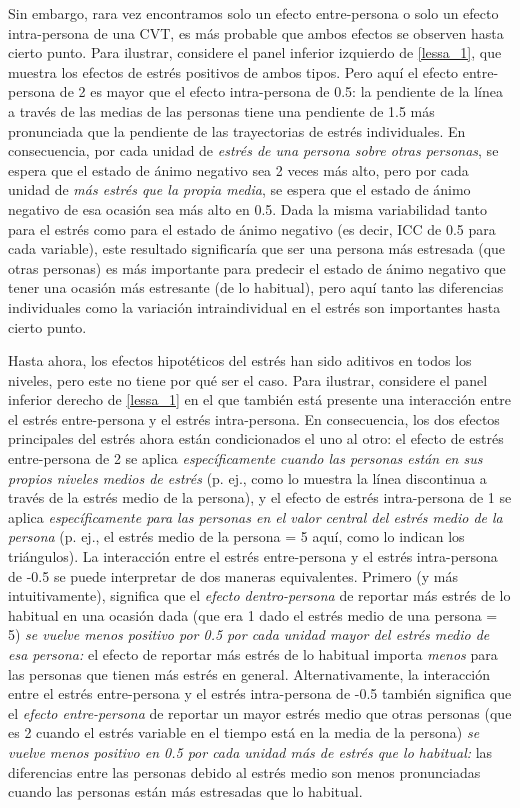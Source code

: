 \documentclass[spanish]{article}
\numberwithin{figure}{subsection}
\numberwithin{equation}{subsection}
\numberwithin{table}{subsection}
\begin{document}
Sin embargo, rara vez encontramos solo un efecto entre-persona o solo un efecto intra-persona de una CVT, es más probable
que ambos efectos se observen hasta cierto punto. Para ilustrar, considere el panel inferior izquierdo de \ref{lessa_1},
que muestra los efectos de estrés positivos de ambos tipos. Pero aquí el efecto entre-persona de 2 es mayor que el efecto
intra-persona de 0.5: la pendiente de la línea a través de las medias de las personas tiene una pendiente de 1.5 más
pronunciada que la pendiente de las trayectorias de estrés individuales. En consecuencia, por cada unidad de
\textit{estrés de una persona sobre otras personas}, se espera que el estado de ánimo negativo sea 2 veces más alto, pero por
cada unidad de \textit{más estrés que la propia media}, se espera que el estado de ánimo negativo de esa ocasión sea más alto
en 0.5. Dada la misma variabilidad tanto para el estrés como para el estado de ánimo negativo (es decir, ICC de 0.5 para cada
variable), este resultado significaría que ser una persona más estresada (que otras personas) es más importante para predecir
el estado de ánimo negativo que tener una ocasión más estresante (de lo habitual), pero aquí tanto las diferencias individuales
como la variación intraindividual en el estrés son importantes hasta cierto punto.

Hasta ahora, los efectos hipotéticos del estrés han sido aditivos en todos los niveles, pero este no tiene por qué ser el caso.
Para ilustrar, considere el panel inferior derecho de \ref{lessa_1} en el que también está presente una interacción entre
el estrés entre-persona y el estrés intra-persona. En consecuencia, los dos efectos principales del estrés ahora están
condicionados el uno al otro: el efecto de estrés entre-persona de 2 se aplica \textit{específicamente cuando las personas
están en sus propios niveles medios de estrés} (p. ej., como lo muestra la línea discontinua a través de la estrés medio
de la persona), y el efecto de estrés intra-persona de 1 se aplica \textit{específicamente para las personas en el valor
central del estrés medio de la persona} (p. ej., el estrés medio de la persona = 5 aquí, como lo indican los triángulos).
La interacción entre el estrés entre-persona y el estrés intra-persona de -0.5 se puede interpretar de dos maneras equivalentes.
Primero (y más intuitivamente), significa que el \textit{efecto dentro-persona} de reportar más estrés de lo habitual en una
ocasión dada (que era 1 dado el estrés medio de una persona = 5) \textit{se vuelve menos positivo por 0.5 por cada unidad mayor del
estrés medio de esa persona:} el efecto de reportar más estrés de lo habitual importa \textit{menos} para las personas que tienen
más estrés en general. Alternativamente, la interacción entre el estrés entre-persona y el estrés intra-persona de -0.5
también significa que el \textit{efecto entre-persona} de reportar un mayor estrés medio que otras personas (que es 2 cuando
el estrés variable en el tiempo está en la media de la persona) \textit{se vuelve menos positivo en 0.5 por cada unidad más
de estrés que lo habitual:} las diferencias entre las personas debido al estrés medio son menos pronunciadas cuando
las personas están más estresadas que lo habitual.
\end{document}

